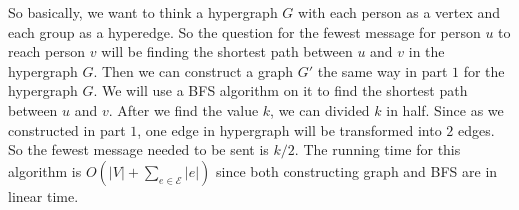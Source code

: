 \documentclass[11pt]{article}
\begin{document}
\begin{solution}
\begin{enumerate}
        So basically, we want to think a hypergraph $G$ with each person as a vertex and each group as a hyperedge. So the question for the fewest message for person $u$ to reach person $v$ will be finding the shortest path between $u$ and $v$ in the hypergraph $G$. Then we can construct a graph $G'$ the same way in part $1$ for the hypergraph $G$. We will use a BFS algorithm on it to find the shortest path between $u$ and $v$. After we find the value $k$, we can divided $k$ in half. Since as we constructed in part $1$, one edge in hypergraph will be transformed into $2$ edges. So the fewest message needed to be sent is $k/2$. The running time for this algorithm is $O(|V| + \sum_{e \in \mathcal{E}} |e|)$ since both constructing graph and BFS are in linear time.
\end{enumerate}
\end{solution}
\end{document}
